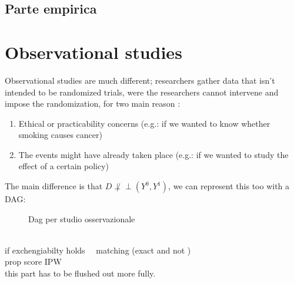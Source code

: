 \subsection{Parte empirica}
\section{Observational studies} %
Observational studies are much different; researchers gather data that isn't intended to be randomized trials, were the researchers cannot intervene and impose the randomization, for two main reason :
\begin{enumerate}
\item Ethical or practicability concerns  (e.g.: if we wanted to know whether smoking causes cancer)
\item The events might have already taken place  (e.g.: if we wanted to study the effect of a certain policy)
\end{enumerate}
The main difference is that $D \not \perp\!\!\!\perp (Y^{0},Y^{1})$, we can represent this too with a DAG:
\begin{figure}[!h]
\centering
\caption{Dag per studio osservazionale}
\label{fig:dag_OBS}
\end{figure} \\
if exchengiabilty holds \ \
matching (exact and not ) \\
prop score IPW \\ 
this part has to be flushed out more fully.








